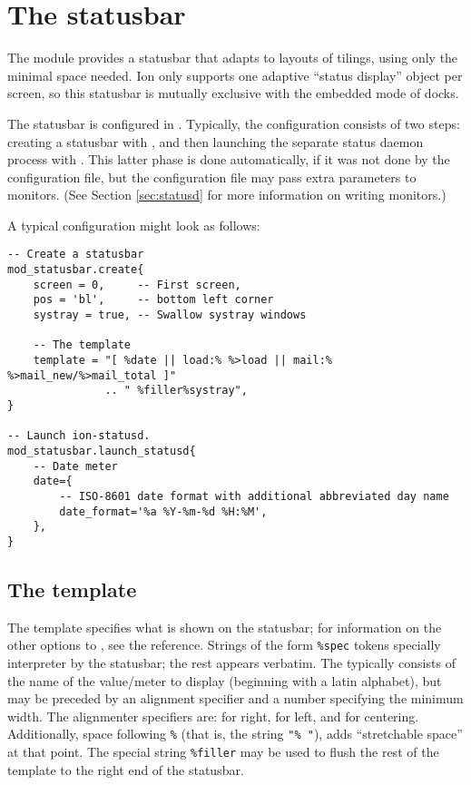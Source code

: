 \section{The statusbar}
\label{sec:statusbar}

The  module provides a statusbar that adapts to 
layouts of tilings, using only the minimal space needed. Ion only 
supports one adaptive ``status display'' object per screen, so this
statusbar is mutually exclusive with the embedded mode of  
docks. 

The statusbar is configured in . Typically,
the configuration consists of two steps: creating a statusbar with
, and then launching the separate
 status daemon process with 
. This latter phase is done
automatically, if it was not done by the configuration file, but
the configuration file may pass extra parameters to 
monitors. (See Section \ref{sec:statusd} for more information on
writing  monitors.)

A typical  configuration might look as follows:


\begin{verbatim}
-- Create a statusbar
mod_statusbar.create{
    screen = 0,     -- First screen, 
    pos = 'bl',     -- bottom left corner
    systray = true, -- Swallow systray windows

    -- The template
    template = "[ %date || load:% %>load || mail:% %>mail_new/%>mail_total ]"
               .. " %filler%systray",
}

-- Launch ion-statusd. 
mod_statusbar.launch_statusd{
    -- Date meter
    date={
        -- ISO-8601 date format with additional abbreviated day name
        date_format='%a %Y-%m-%d %H:%M',
    },      
}
\end{verbatim}


\subsection{The template}

The template specifies what is shown on the statusbar; for information
on the other options to , see the reference. 
Strings of the form \verb!%spec! tokens specially interpreter by
the statusbar; the rest appears verbatim. The  typically
consists of the name of the value/meter to display (beginning with a latin
alphabet), but may be preceded by an alignment specifier and a number
specifying the minimum width. The alignmenter specifiers are: \code{>}
for right, \code{<} for left,  and \code{|} for centering. Additionally,
space following \verb!%! (that is, the string \verb!"% "!), adds
``stretchable space'' at that point. The special string \verb!%filler!
may be used to flush the rest of the template to the right end of 
the statusbar. 

